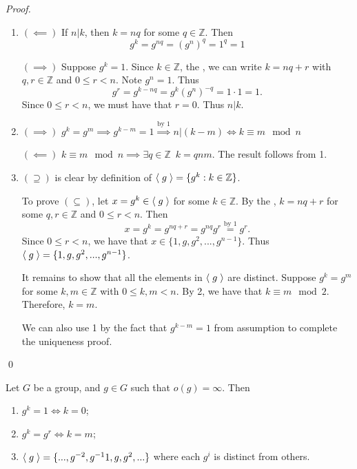 \documentclass[notoc,notitlepage]{tufte-book}
\begin{document}
\begin{proof}
  \begin{enumerate}
    \item $(\impliedby)$ If $n | k$, then $k = nq$ for some $q \in \mathbb{Z}$. Then
      \begin{equation*}
        g^k = g^{nq} = (g^n)^q = 1^q = 1
      \end{equation*}

      $(\implies)$ Suppose $g^k = 1$. Since $k \in \mathbb{Z}$, the , we can write $k = nq + r$ with $q, r \in \mathbb{Z}$ and $0 \leq r < n$. Note $g^n = 1$. Thus
      \begin{equation*}
        g^r = g^{k - nq}  = g^k (g^n)^{-q} = 1 \cdot 1 = 1.
      \end{equation*}
      Since $0 \leq r < n$, we must have that $r = 0$. Thus $n | k$.

    \item $(\implies)$ $g^k = g^m \implies g^{k - m} = 1 \overset{\text{by } 1}{\implies} n | ( k - m ) \iff k \equiv m \mod n$
    
      $(\impliedby)$ $k \equiv m \mod n \implies \exists q \in \mathbb{Z} \enspace k = qnm$. The result follows from 1.

    \item $(\supseteq)$ is clear by definition of $\langle \; g \; \rangle = \{g^k : k \in \mathbb{Z}\}$.

      To prove $(\subseteq)$, let $x = g^k \in \langle \; g \; \rangle$ for some $k \in \mathbb{Z}$. By the , $k = nq + r$ for some $q, r \in \mathbb{Z}$ and $0 \leq r < n$. Then
      \begin{equation*}
        x = g^k = g^{nq + r} = g^{nq} g^r \overset{\text{by } 1}{=} g^r.
      \end{equation*}
      Since $0 \leq r < n$, we have that $x \in \{1, g, g^2, ..., g^{n - 1} \}$. Thus $\langle \; g \; \rangle = \{1, g, g^2, ..., g^{n - 1} \}$.

      It remains to show that all the elements in $\langle \; g \; \rangle$ are distinct. Suppose $g^k = g^m$ for some $k, m \in \mathbb{Z}$ with $0 \leq k, m < n$. By 2, we have that $k \equiv m \mod 2$. Therefore, $k = m$.

      We can also use 1 by the fact that $g^{k - m} = 1$ from assumption to complete the uniqueness proof.
  \end{enumerate} \qed
\end{proof}

\begin{propo}
\label{propo:property_of_elements_of_infinite_order}
  Let $G$ be a group, and $g \in G$ such that $o(g) = \infty$. Then
  \begin{enumerate}
    \item $g^k = 1 \iff k = 0$;
    \item $g^k = g^r \iff k = m$;
    \item $\langle \; g \; \rangle = \{..., g^{-2}, g^{-1} 1, g, g^2, ...\}$ where each $g^i$ is distinct from others.
  \end{enumerate}
\end{propo}
\end{document}
